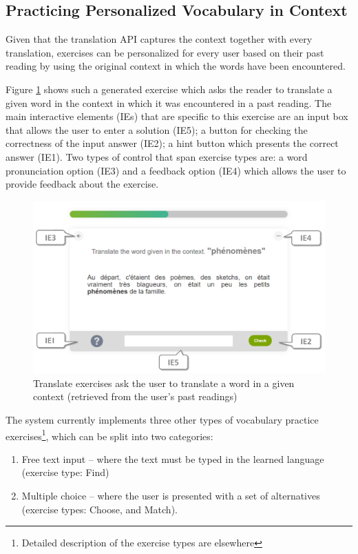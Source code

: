 
\subsection{Practicing Personalized Vocabulary in Context}

Given that the translation API captures the context together with every translation, exercises can be personalized for every user based on their past reading by using the original context in which the words have been encountered.

Figure \ref{fig:exercise_translate} shows such a generated exercise which asks the reader to translate a given word in the context in which it was encountered in a past reading. The main interactive elements (IEs) that are specific to this exercise are an input box that allows the user to enter a solution (IE5); a button for checking the correctness of the input answer (IE2); a hint button which presents the correct answer (IE1). Two types of control that span exercise types are: a word pronunciation option (IE3) and a feedback option (IE4) which allows the user to provide feedback about the exercise.

\begin{figure}[h!]
\centering
  \includegraphics[width=0.9\columnwidth]{figures/exercise_translate}
  \caption{Translate exercises ask the user to translate a word in a given context (retrieved from the user's past readings)}
  \label{fig:exercise_translate}
\end{figure}

	The system currently implements three other types of vocabulary practice exercises\footnote{Detailed description of the exercise types are elsewhere\cite{Avagyan17a-blocks}}, which can be split into two categories: 
\begin{enumerate}
	
	\item Free text input -- where the text must be typed in the learned language (exercise type: Find)

	\item Multiple choice -- where the user is presented with a set of alternatives (exercise types: Choose, and Match). 

\end{enumerate}

